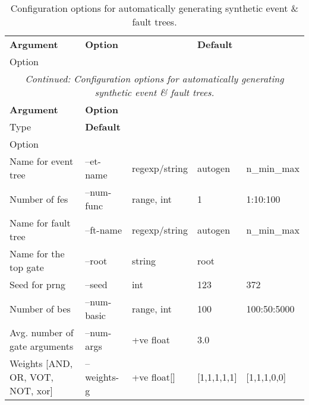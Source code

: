 \begin{longtable}{@{}lllll@{}}
\caption{Configuration options for automatically generating synthetic event \& fault trees.}
\label{tab:autogen_config_et_ft}\\
\toprule
\textbf{Argument} &
  \textbf{Option} &
  \textbf{\begin{tabular}[c]{@{}l@{}}Type\end{tabular}} &
  \textbf{Default} &
  \textbf{\begin{tabular}[c]{@{}l@{}}Applied\\ Option\end{tabular}} \\* \midrule
\endfirsthead
\multicolumn{5}{c}{\textit{Continued: Configuration options for automatically generating synthetic event \& fault trees.}}\\
\toprule
\textbf{Argument} &
  \textbf{Option} &
  \textbf{\begin{tabular}[c]{@{}l@{}}Option\\ Type\end{tabular}} &
  \textbf{Default} &
  \textbf{\begin{tabular}[c]{@{}l@{}}Applied\\ Option\end{tabular}} \\* \midrule
\endhead
%
\bottomrule
\endfoot
%
\endlastfoot
Name for event tree                         & --et-name   & \acrshort{regexp}/string   & autogen & n\_min\_max \\
Number of \acrfull{fe}s                      & --num-func & range, int      & 1     & 1:10:100 \\
Name for fault tree                         & --ft-name   & \acrshort{regexp}/string   & autogen & n\_min\_max \\
Name for the top gate                       & --root      & string          & root    &             \\
Seed for \acrshort{prng}                               & --seed      & int             & 123     & 372         \\
Number of \acrshort{be}s                      & --num-basic & range, int      & 100     & 100:50:5000 \\
Avg. number of gate arguments            & --num-args  & +ve float       & 3.0     &             \\
Weights {[}AND, OR, VOT, NOT, \acrshort{xor}{]} & --weights-g     & +ve float{[}{]}      & {[}1,1,1,1,1{]}  & {[}1,1,1,0,0{]}         \\

\end{longtable}
